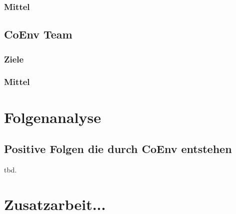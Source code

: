 \documentclass{article}
\begin{document}
\subsubsection*{Mittel}

\subsection{CoEnv Team}
\subsubsection*{Ziele}
\subsubsection*{Mittel}

\section{Folgenanalyse}

\subsection{Positive Folgen die durch CoEnv entstehen}

tbd.

\section{Zusatzarbeit...}

% 
% 
\end{document}
